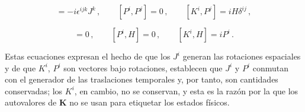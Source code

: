 \documentclass[a4paper,11pt]{book} %
\begin{document}
\begin{equation}
[K^{i},K^{j}]=-i\epsilon^{ijk}J^{k}\,,\qquad
[P^{i},P^{j}]=0\,,\qquad
[K^{i},P^{j}]=iH\delta^{ij}\,,
\end{equation}

\begin{equation}
[J^{i},H]=0\,,\qquad
[P^{i},H]=0\,,\qquad
[K^{i},H]=iP^{i}\,.
\end{equation}

\noindent
Estas ecuaciones expresan el hecho de que los $J^{i}$ generan las
rotaciones espaciales y de que $K^{i}$, $P^{i}$ son vectores bajo rotaciones, establecen que $J^{i}$ y $P^{i}$ conmutan con el
generador de las traslaciones temporales y, por tanto, son cantidades
conservadas; los $K^{i}$, en cambio, no se conservan, y esta es la razón por la que los autovalores de $\mathbf{K}$ no se usan para etiquetar los estados físicos.
\end{document}
